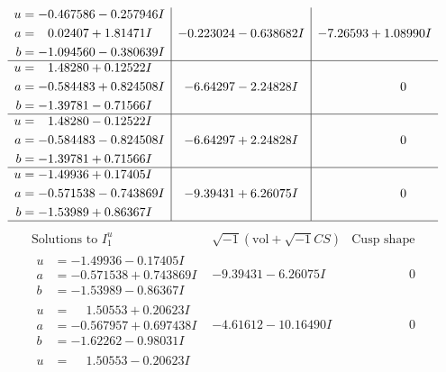 \documentclass[1p]{elsarticle_modified}
\theoremstyle{definition}
\newcommand{\I}{\sqrt{-1}}
\begin{document}
$$\begin{array}{c|c|c}
\begin{aligned}
u &= -0.467586 - 0.257946 I \\
a &= \phantom{-}0.02407 + 1.81471 I \\
b &= -1.094560 - 0.380639 I\end{aligned}
 & -0.223024 - 0.638682 I & -7.26593 + 1.08990 I \\ \hline\begin{aligned}
u &= \phantom{-}1.48280 + 0.12522 I \\
a &= -0.584483 + 0.824508 I \\
b &= -1.39781 - 0.71566 I\end{aligned}
 & -6.64297 - 2.24828 I & \phantom{-0.000000 } 0 \\ \hline\begin{aligned}
u &= \phantom{-}1.48280 - 0.12522 I \\
a &= -0.584483 - 0.824508 I \\
b &= -1.39781 + 0.71566 I\end{aligned}
 & -6.64297 + 2.24828 I & \phantom{-0.000000 } 0 \\ \hline\begin{aligned}
u &= -1.49936 + 0.17405 I \\
a &= -0.571538 - 0.743869 I \\
b &= -1.53989 + 0.86367 I\end{aligned}
 & -9.39431 + 6.26075 I & \phantom{-0.000000 } 0\\
 \hline 
 \end{array}$$\newpage$$\begin{array}{c|c|c}  
\text{Solutions to }I^u_{1}& \I (\text{vol} + \sqrt{-1}CS) & \text{Cusp shape}\\
 \hline 
\begin{aligned}
u &= -1.49936 - 0.17405 I \\
a &= -0.571538 + 0.743869 I \\
b &= -1.53989 - 0.86367 I\end{aligned}
 & -9.39431 - 6.26075 I & \phantom{-0.000000 } 0 \\ \hline\begin{aligned}
u &= \phantom{-}1.50553 + 0.20623 I \\
a &= -0.567957 + 0.697438 I \\
b &= -1.62262 - 0.98031 I\end{aligned}
 & -4.61612 - 10.16490 I & \phantom{-0.000000 } 0 \\ \hline\begin{aligned}
u &= \phantom{-}1.50553 - 0.20623 I \\

\end{aligned}
\end{array}$$
\end{document}
